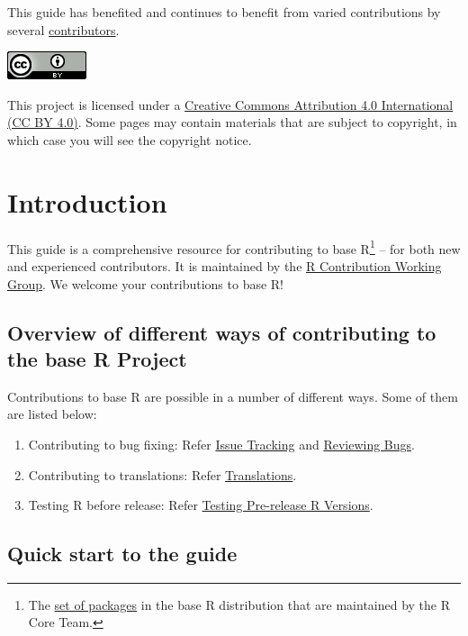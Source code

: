 \documentclass[
]{book}
\providecommand{\tightlist}{%
  \setlength{\itemsep}{0pt}\setlength{\parskip}{0pt}}
\begin{document}
This guide has benefited and continues to benefit from varied contributions by several \href{https://github.com/r-devel/rdevguide\#contributors-}{contributors}.

\href{https://creativecommons.org/licenses/by/4.0/}{\includegraphics{img/ccby.png}}

This project is licensed under a \href{https://creativecommons.org/licenses/by/4.0/}{Creative Commons Attribution 4.0 International (CC BY 4.0)}. Some pages may contain materials that are subject to copyright, in which case you will see the copyright notice.

\chapter{Introduction}\label{introduction}

This guide is a comprehensive resource for contributing to base R\footnote{The \href{https://cran.r-project.org/doc/FAQ/R-FAQ.html\#Add_002don-packages-in-R}{set of packages} in the base R distribution that are maintained by the R Core Team.} -- for both new and experienced contributors. It is maintained by the \href{/working-group}{R Contribution Working Group}. We welcome your contributions to base R!

\section{Overview of different ways of contributing to the base R Project}\label{overview-of-different-ways-of-contributing-to-the-base-r-project}

Contributions to base R are possible in a number of different ways. Some of them are listed below:

\begin{enumerate}
\def\labelenumi{\arabic{enumi}.}
\tightlist
\item
  Contributing to bug fixing: Refer \hyperref[IssueTrack]{Issue Tracking} and \hyperref[ReviewBugs]{Reviewing Bugs}.
\item
  Contributing to translations: Refer \hyperref[]{Translations}.
\item
  Testing R before release: Refer \hyperref[TestRVer]{Testing Pre-release R Versions}.
\end{enumerate}

\section{Quick start to the guide}\label{quick-start-to-the-guide}
\end{document}
